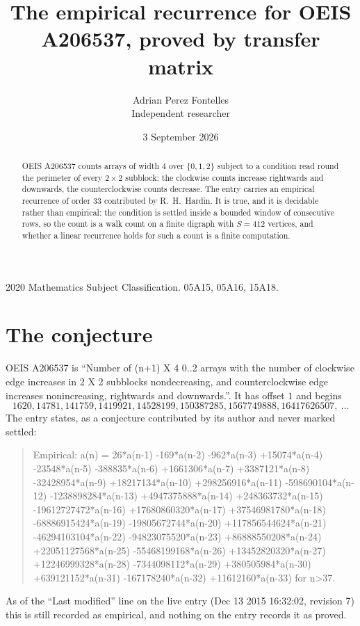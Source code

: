 \documentclass[11pt,a4paper]{article}
\title{The empirical recurrence for OEIS A206537, proved by transfer matrix}
\author{Adrian Perez Fontelles\\ \small Independent researcher}
\date{3 September 2026}
\theoremstyle{plain}
\theoremstyle{definition}
\begin{document}
\maketitle

\begin{abstract}
OEIS A206537 counts arrays of width $4$ over $\{0,1,2\}$ subject to a condition read round the
perimeter of every $2\times2$ subblock: the clockwise counts increase rightwards and downwards, the counterclockwise counts decrease. The entry carries an empirical recurrence of
order $33$ contributed by R.~H.~Hardin. It is true, and it is decidable rather than
empirical: the condition is settled inside a bounded window of consecutive rows, so the
count is a walk count on a finite digraph with $S=412$ vertices, and whether a linear
recurrence holds for such a count is a finite computation.
\end{abstract}

\noindent\small 2020 Mathematics Subject Classification. 05A15, 05A16, 15A18.\normalsize

\section{The conjecture}

OEIS A206537 is ``Number of (n+1) X 4 0..2 arrays with the number of clockwise edge increases in 2 X 2 subblocks nondecreasing, and counterclockwise edge increases nonincreasing, rightwards and downwards.''. It has offset $1$ and begins
\[
1620, 14781, 141759, 1419921, 14528199, 150387285, 1567749888, 16417626507,\ \dots
\]
The entry states, as a conjecture contributed by its author and never marked settled:
\begin{quote}
Empirical: a(n) = 26*a(n-1) -169*a(n-2) -962*a(n-3) +15074*a(n-4) -23548*a(n-5) -388835*a(n-6) +1661306*a(n-7) +3387121*a(n-8) -32428954*a(n-9) +18217134*a(n-10) +298256916*a(n-11) -598690104*a(n-12) -1238898284*a(n-13) +4947375888*a(n-14) +248363732*a(n-15) -19612727472*a(n-16) +17680860320*a(n-17) +37546981780*a(n-18) -68886915424*a(n-19) -19805672744*a(n-20) +117856544624*a(n-21) -46294103104*a(n-22) -94823075520*a(n-23) +86888550208*a(n-24) +22051127568*a(n-25) -55468199168*a(n-26) +13452820320*a(n-27) +12246999328*a(n-28) -7344098112*a(n-29) +380505984*a(n-30) +639121152*a(n-31) -167178240*a(n-32) +11612160*a(n-33) for n>37.
\end{quote}
As of the ``Last modified'' line on the live entry (Dec 13 2015 16:32:02, revision 7) this is still
recorded as empirical, and nothing on the entry records it as proved.
\end{document}
